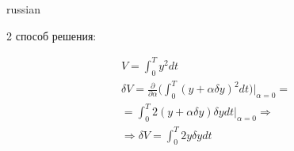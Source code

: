 \documentclass{article}
\begin{document}
\begin{otherlanguage*}{russian}
\begin{enumerate}
2 способ решения:

\begin{align}
V = \int_0^T y^2 dt \\
\delta V = \frac{\partial }{\partial \alpha} \big( \int_0^T (y + \alpha \delta y)^ 2 dt\big)|_{\alpha = 0} = \\
= \int_0^T 2 (y + \alpha \delta y) \delta y dt |_{\alpha = 0} \Rightarrow \\
\Rightarrow \delta V = \int_0^T 2y\delta y dt 
\end{align}
\end{enumerate}
\end{otherlanguage*}
\end{document}
